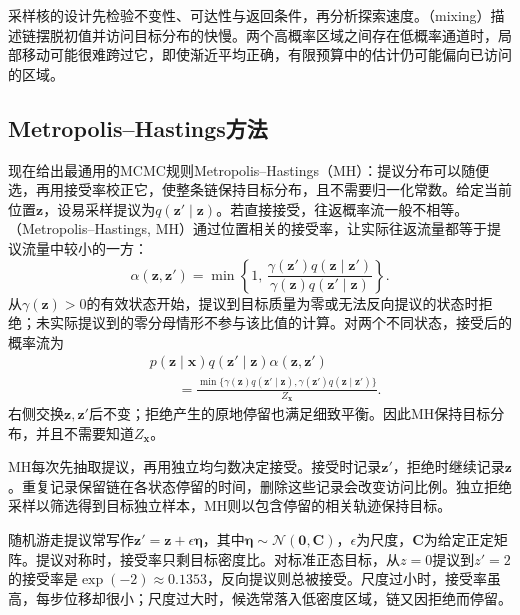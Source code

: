 采样核的设计先检验不变性、可达性与返回条件，再分析探索速度。（mixing）描述链摆脱初值并访问目标分布的快慢。两个高概率区域之间存在低概率通道时，局部移动可能很难跨过它，即使渐近平均正确，有限预算中的估计仍可能偏向已访问的区域。

\subsection{Metropolis--Hastings方法}
\label{sec:pgm-sampling-mh}

现在给出最通用的MCMC规则Metropolis–Hastings（MH）：提议分布可以随便选，再用接受率校正它，使整条链保持目标分布，且不需要归一化常数。给定当前位置$\bm{z}$，设易采样提议为$q(\bm{z}'\mid\bm{z})$。若直接接受，往返概率流一般不相等。（Metropolis--Hastings, MH）通过位置相关的接受率，让实际往返流量都等于提议流量中较小的一方：
\begin{equation}
  \alpha(\bm{z},\bm{z}')
    =\min\left\{1,\,
      \frac{\gamma(\bm{z}')q(\bm{z}\mid\bm{z}')}
           {\gamma(\bm{z})q(\bm{z}'\mid\bm{z})}\right\}.
  \label{eq:pgm-sampling-mh-acceptance}
\end{equation}
从$\gamma(\bm{z})>0$的有效状态开始，提议到目标质量为零或无法反向提议的状态时拒绝；未实际提议到的零分母情形不参与该比值的计算。对两个不同状态，接受后的概率流为
\[
  \begin{aligned}
    &p(\bm{z}\mid\bm{x})q(\bm{z}'\mid\bm{z})\alpha(\bm{z},\bm{z}')\\
    &\qquad=\frac{\min\{\gamma(\bm{z})q(\bm{z}'\mid\bm{z}),
                    \gamma(\bm{z}')q(\bm{z}\mid\bm{z}')\}}
         {Z_{\bm{x}}}.
  \end{aligned}
\]
右侧交换$\bm{z},\bm{z}'$后不变；拒绝产生的原地停留也满足细致平衡。因此MH保持目标分布，并且不需要知道$Z_{\bm{x}}$。

MH每次先抽取提议，再用独立均匀数决定接受。接受时记录$\bm{z}'$，拒绝时继续记录$\bm{z}$。重复记录保留链在各状态停留的时间，删除这些记录会改变访问比例。独立拒绝采样以筛选得到目标独立样本，MH则以包含停留的相关轨迹保持目标。

随机游走提议常写作$\bm{z}'=\bm{z}+\epsilon\bm{\eta}$，其中$\bm{\eta}\sim\mathcal{N}(\bm{0},\bm{C})$，$\epsilon$为尺度，$\bm{C}$为给定正定矩阵。提议对称时，接受率只剩目标密度比。对标准正态目标，从$z=0$提议到$z'=2$的接受率是$\exp(-2)\approx0.1353$，反向提议则总被接受。尺度过小时，接受率虽高，每步位移却很小；尺度过大时，候选常落入低密度区域，链又因拒绝而停留。

